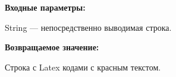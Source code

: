 \textbf{Входные параметры:}

String --- непосредственно выводимая строка.

\textbf{Возвращаемое значение:}

Строка с Latex кодами с красным текстом.